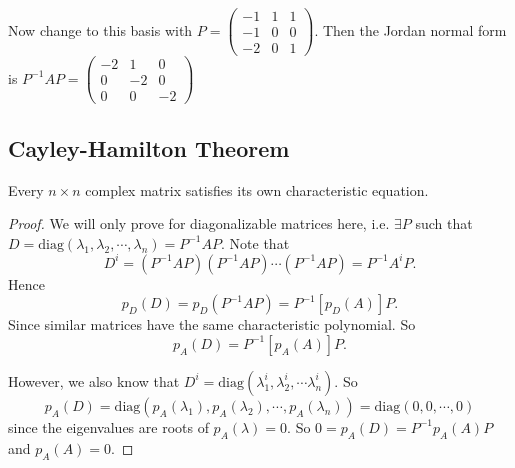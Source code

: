 \documentclass[a4paper]{article}
\begin{document}
\begin{eg}
  Now change to this basis with 
  $P = \begin{pmatrix}
    -1 & 1 & 1\\
    -1 & 0 & 0\\
    -2 & 0 & 1
  \end{pmatrix}$. Then the Jordan normal form is $P^{-1}AP = 
  \begin{pmatrix}
    -2 & 1 & 0\\
    0 & -2 & 0\\
    0 & 0 & -2
  \end{pmatrix}$
\end{eg}

\subsection{Cayley-Hamilton Theorem}
\begin{thm}
  Every $n\times n$ complex matrix satisfies its own characteristic equation.
\end{thm}

\begin{proof}
  We will only prove for diagonalizable matrices here, i.e. $\exists P$ such that $D = \mathrm{diag}(\lambda_1, \lambda_2, \cdots, \lambda_n) = P^{-1}AP$.
Note that
\[
D^i = (P^{-1}AP)(P^{-1}AP)\cdots(P^{-1}AP) = P^{-1}A^iP.
\]
Hence
\[
p_D(D) = p_D(P^{-1}AP) = P^{-1}[p_D(A)]P.
\]
Since similar matrices have the same characteristic polynomial. So
\[
p_A(D) = P^{-1}[p_A(A)]P.
\]

However, we also know that $D^i = \mathrm{diag}(\lambda_1^i, \lambda_2^i, \cdots \lambda_n^i)$. So
\[
p_A(D) = \mathrm{diag}(p_A(\lambda_1), p_A(\lambda_2), \cdots, p_A(\lambda_n)) = \mathrm{diag}(0, 0, \cdots, 0)
\]
since the eigenvalues are roots of $p_A(\lambda) = 0$. So $0 = p_A(D) = P^{-1}p_A(A)P$ and $p_A(A) = 0$.
\end{proof}
\end{document}
